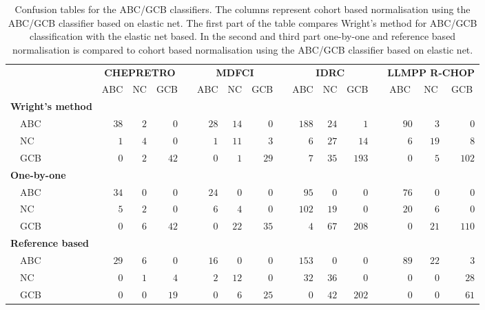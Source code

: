 \begin{table}[!tbp]
{\footnotesize
\caption{Confusion tables for the ABC/GCB classifiers.
The columns represent cohort based normalisation using the ABC/GCB classifier
based on elastic net.
The first part of the table compares Wright's method for ABC/GCB classification
with the elastic net based.
In the second and third part one-by-one and reference based normalisation is
compared to cohort based normalisation using the ABC/GCB classifier based on
elastic net.\label{tab:confusionABCGCBHEMA}} 
\begin{center}
\begin{tabular}{lrrrcrrrcrrrcrrr}
\hline\hline
\multicolumn{1}{l}{\bfseries }&\multicolumn{3}{c}{\bfseries CHEPRETRO}&\multicolumn{1}{c}{\bfseries }&\multicolumn{3}{c}{\bfseries MDFCI}&\multicolumn{1}{c}{\bfseries }&\multicolumn{3}{c}{\bfseries IDRC}&\multicolumn{1}{c}{\bfseries }&\multicolumn{3}{c}{\bfseries LLMPP R-CHOP}\tabularnewline
\cline{2-4} \cline{6-8} \cline{10-12} \cline{14-16}
\multicolumn{1}{l}{}&\multicolumn{1}{c}{ABC}&\multicolumn{1}{c}{NC}&\multicolumn{1}{c}{GCB}&\multicolumn{1}{c}{}&\multicolumn{1}{c}{ABC}&\multicolumn{1}{c}{NC}&\multicolumn{1}{c}{GCB}&\multicolumn{1}{c}{}&\multicolumn{1}{c}{ABC}&\multicolumn{1}{c}{NC}&\multicolumn{1}{c}{GCB}&\multicolumn{1}{c}{}&\multicolumn{1}{c}{ABC}&\multicolumn{1}{c}{NC}&\multicolumn{1}{c}{GCB}\tabularnewline
\hline
{\bfseries Wright's method}&&&&&&&&&&&&&&&\tabularnewline
~~ABC&$38$&$2$&$ 0$&&$28$&$14$&$ 0$&&$188$&$24$&$  1$&&$90$&$ 3$&$  0$\tabularnewline
~~NC&$ 1$&$4$&$ 0$&&$ 1$&$11$&$ 3$&&$  6$&$27$&$ 14$&&$ 6$&$19$&$  8$\tabularnewline
~~GCB&$ 0$&$2$&$42$&&$ 0$&$ 1$&$29$&&$  7$&$35$&$193$&&$ 0$&$ 5$&$102$\tabularnewline
\hline
{\bfseries One-by-one}&&&&&&&&&&&&&&&\tabularnewline
~~ABC&$34$&$0$&$ 0$&&$24$&$ 0$&$ 0$&&$ 95$&$ 0$&$  0$&&$76$&$ 0$&$  0$\tabularnewline
~~NC&$ 5$&$2$&$ 0$&&$ 6$&$ 4$&$ 0$&&$102$&$19$&$  0$&&$20$&$ 6$&$  0$\tabularnewline
~~GCB&$ 0$&$6$&$42$&&$ 0$&$22$&$35$&&$  4$&$67$&$208$&&$ 0$&$21$&$110$\tabularnewline
\hline
{\bfseries Reference based}&&&&&&&&&&&&&&&\tabularnewline
~~ABC&$29$&$6$&$ 0$&&$16$&$ 0$&$ 0$&&$153$&$ 0$&$  0$&&$89$&$22$&$  3$\tabularnewline
~~NC&$ 0$&$1$&$ 4$&&$ 2$&$12$&$ 0$&&$ 32$&$36$&$  0$&&$ 0$&$ 0$&$ 28$\tabularnewline
~~GCB&$ 0$&$0$&$19$&&$ 0$&$ 6$&$25$&&$  0$&$42$&$202$&&$ 0$&$ 0$&$ 61$\tabularnewline
\hline
\end{tabular}\end{center}}

\end{table}
